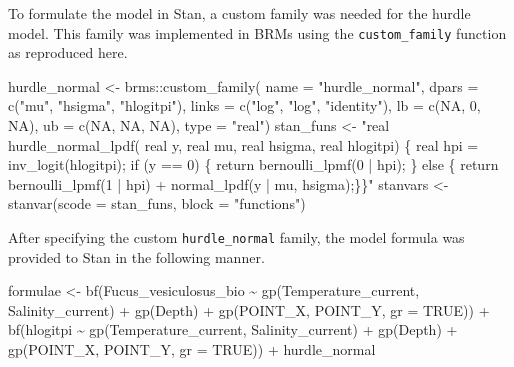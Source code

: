 \documentclass[
  12pt,
  twoside]{book}
\newenvironment{Shaded}{\begin{snugshade}}{\end{snugshade}}
\newcommand{\AttributeTok}[1]{\textcolor[rgb]{0.77,0.63,0.00}{#1}}
\newcommand{\ConstantTok}[1]{\textcolor[rgb]{0.00,0.00,0.00}{#1}}
\newcommand{\DecValTok}[1]{\textcolor[rgb]{0.00,0.00,0.81}{#1}}
\newcommand{\FunctionTok}[1]{\textcolor[rgb]{0.00,0.00,0.00}{#1}}
\newcommand{\NormalTok}[1]{#1}
\newcommand{\OtherTok}[1]{\textcolor[rgb]{0.56,0.35,0.01}{#1}}
\newcommand{\SpecialCharTok}[1]{\textcolor[rgb]{0.00,0.00,0.00}{#1}}
\newcommand{\StringTok}[1]{\textcolor[rgb]{0.31,0.60,0.02}{#1}}
\theoremstyle{definition}
\theoremstyle{definition}
\theoremstyle{definition}
\theoremstyle{remark}
\begin{document}
To formulate the model in Stan, a custom family was needed for the hurdle model.
This family was implemented in BRMs using the \texttt{custom\_family} function as reproduced here.

\begin{Shaded}
\begin{Highlighting}[]
\NormalTok{hurdle\_normal }\OtherTok{\textless{}{-}}\NormalTok{ brms}\SpecialCharTok{::}\FunctionTok{custom\_family}\NormalTok{(}
  \AttributeTok{name =} \StringTok{"hurdle\_normal"}\NormalTok{, }
  \AttributeTok{dpars =} \FunctionTok{c}\NormalTok{(}\StringTok{"mu"}\NormalTok{, }\StringTok{"hsigma"}\NormalTok{, }\StringTok{"hlogitpi"}\NormalTok{),}
  \AttributeTok{links =} \FunctionTok{c}\NormalTok{(}\StringTok{"log"}\NormalTok{, }\StringTok{"log"}\NormalTok{, }\StringTok{"identity"}\NormalTok{), }
  \AttributeTok{lb =} \FunctionTok{c}\NormalTok{(}\ConstantTok{NA}\NormalTok{, }\DecValTok{0}\NormalTok{, }\ConstantTok{NA}\NormalTok{),}
  \AttributeTok{ub =} \FunctionTok{c}\NormalTok{(}\ConstantTok{NA}\NormalTok{, }\ConstantTok{NA}\NormalTok{, }\ConstantTok{NA}\NormalTok{),}
  \AttributeTok{type =} \StringTok{"real"}\NormalTok{)}
\NormalTok{stan\_funs }\OtherTok{\textless{}{-}} \StringTok{"real hurdle\_normal\_lpdf(}
\StringTok{                real y, real mu, real hsigma, real hlogitpi) \{ }
\StringTok{    real hpi = inv\_logit(hlogitpi);}
\StringTok{    if (y == 0) \{}
\StringTok{      return bernoulli\_lpmf(0 | hpi); }
\StringTok{    \} else \{ }
\StringTok{      return bernoulli\_lpmf(1 | hpi) +  }
\StringTok{        normal\_lpdf(y | mu, hsigma);\}\}"}
\NormalTok{stanvars }\OtherTok{\textless{}{-}} \FunctionTok{stanvar}\NormalTok{(}\AttributeTok{scode =}\NormalTok{ stan\_funs, }\AttributeTok{block =} \StringTok{"functions"}\NormalTok{)}
\end{Highlighting}
\end{Shaded}

After specifying the custom \texttt{hurdle\_normal} family, the model formula was provided to Stan in the following manner.

\begin{Shaded}
\begin{Highlighting}[]
\NormalTok{formulae }\OtherTok{\textless{}{-}} 
  \FunctionTok{bf}\NormalTok{(Fucus\_vesiculosus\_bio }\SpecialCharTok{\textasciitilde{}} \FunctionTok{gp}\NormalTok{(Temperature\_current, Salinity\_current) }\SpecialCharTok{+} 
    \FunctionTok{gp}\NormalTok{(Depth) }\SpecialCharTok{+} \FunctionTok{gp}\NormalTok{(POINT\_X, POINT\_Y, }\AttributeTok{gr =} \ConstantTok{TRUE}\NormalTok{)) }\SpecialCharTok{+}
  \FunctionTok{bf}\NormalTok{(hlogitpi }\SpecialCharTok{\textasciitilde{}} \FunctionTok{gp}\NormalTok{(Temperature\_current, Salinity\_current) }\SpecialCharTok{+} \FunctionTok{gp}\NormalTok{(Depth) }\SpecialCharTok{+} 
    \FunctionTok{gp}\NormalTok{(POINT\_X, POINT\_Y, }\AttributeTok{gr =} \ConstantTok{TRUE}\NormalTok{)) }\SpecialCharTok{+}
\NormalTok{  hurdle\_normal}
\end{Highlighting}
\end{Shaded}
\end{document}
